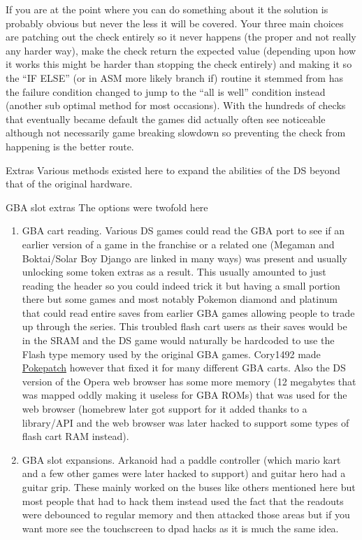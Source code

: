 \documentclass[
]{book}
\providecommand{\tightlist}{%
  \setlength{\itemsep}{0pt}\setlength{\parskip}{0pt}}
\begin{document}
If you are at the point where you can do something about it the solution is probably obvious but never the less it will be covered. Your three main choices are patching out the check entirely so it never happens (the proper and not really any harder way), make the check return the expected value (depending upon how it works this might be harder than stopping the check entirely) and making it so the ``IF ELSE'' (or in ASM more likely branch if) routine it stemmed from has the failure condition changed to jump to the ``all is well'' condition instead (another sub optimal method for most occasions). With the hundreds of checks that eventually became default the games did actually often see noticeable although not necessarily game breaking slowdown so preventing the check from happening is the better route.

Extras Various methods existed here to expand the abilities of the DS beyond that of the original hardware.

GBA slot extras The options were twofold here

\begin{enumerate}
\def\labelenumi{\arabic{enumi}.}
\tightlist
\item
  GBA cart reading. Various DS games could read the GBA port to see if an earlier version of a game in the franchise or a related one (Megaman and Boktai/Solar Boy Django are linked in many ways) was present and usually unlocking some token extras as a result. This usually amounted to just reading the header so you could indeed trick it but having a small portion there but some games and most notably Pokemon diamond and platinum that could read entire saves from earlier GBA games allowing people to trade up through the series. This troubled flash cart users as their saves would be in the SRAM and the DS game would naturally be hardcoded to use the Flash type memory used by the original GBA games. Cory1492 made \href{http://filetrip.net/nds-downloads/rom-hacks/download-pokepatch-42-f27240.html}{Pokepatch} however that fixed it for many different GBA carts. Also the DS version of the Opera web browser has some more memory (12 megabytes that was mapped oddly making it useless for GBA ROMs) that was used for the web browser (homebrew later got support for it added thanks to a library/API and the web browser was later hacked to support some types of flash cart RAM instead).
\item
  GBA slot expansions. Arkanoid had a paddle controller (which mario kart and a few other games were later hacked to support) and guitar hero had a guitar grip. These mainly worked on the buses like others mentioned here but most people that had to hack them instead used the fact that the readouts were debounced to regular memory and then attacked those areas but if you want more see the touchscreen to dpad hacks as it is much the same idea.
\end{enumerate}
\end{document}
